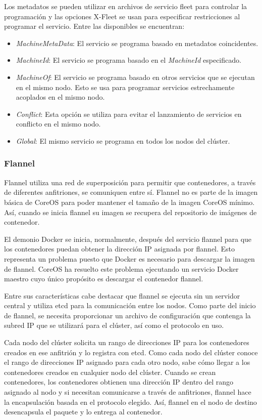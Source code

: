 Los metadatos se pueden utilizar en archivos de servicio fleet para controlar la programación y las opciones X-Fleet se usan para especificar restricciones al programar el servicio. Entre las disponibles se encuentran:
\begin{itemize}
\item \textit{MachineMetaData}: El servicio se programa basado en metadatos coincidentes.
\item \textit{MachineId}: El servicio se programa basado en el \textit{MachineId} especificado.
\item \textit{MachineOf}: El servicio se programa basado en otros servicios que se ejecutan en el mismo nodo. Esto se usa para programar servicios estrechamente acoplados en el mismo nodo.
\item \textit{Conflict}: Esta opción se utiliza para evitar el lanzamiento de servicios en conflicto en el mismo nodo.
\item \textit{Global}: El mismo servicio se programa en todos los nodos del clúster.
\end{itemize}

\subsubsection{Flannel}

Flannel utiliza una red de superposición para permitir que contenedores, a través de diferentes anfitriones, se comuniquen entre sí. Flannel no es parte de la imagen básica de CoreOS para poder mantener el tamaño de la imagen CoreOS mínimo. Así, cuando se inicia flannel su imagen se recupera del repositorio de imágenes de contenedor. 

El demonio Docker se inicia, normalmente, después del servicio flannel para que los contenedores puedan obtener la dirección IP asignada por flannel. Esto representa un problema puesto que Docker es necesario para descargar la imagen de flannel. CoreOS ha resuelto este problema ejecutando un servicio Docker maestro cuyo único propósito es descargar el contenedor flannel.

Entre sus características cabe destacar que flannel se ejecuta sin un servidor central y utiliza etcd para la comunicación entre los nodos. Como parte del inicio de flannel, se necesita proporcionar un archivo de configuración que contenga la subred IP que se utilizará para el clúster, así como el protocolo en uso.

Cada nodo del clúster solicita un rango de direcciones IP para los contenedores creados en ese anfitrión y lo registra con etcd. Como cada nodo del clúster conoce el rango de direcciones IP asignado para cada otro nodo, sabe cómo llegar a los contenedores creados en cualquier nodo del clúster. Cuando se crean contenedores, los contenedores obtienen una dirección IP dentro del rango asignado al nodo y si necesitan comunicarse a través de anfitriones, flannel hace la encapsulación basada en el protocolo elegido. Así, flannel en el nodo de destino desencapsula el paquete y lo entrega al contenedor.

